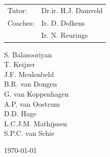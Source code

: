 \begin{titlepage}
\begin{center}
\vspace{0.5cm}
\begin{tabular}{l l}
Tutor: & Dr.ir. H.J. Damveld \\
Coaches: & Ir. D. Dolkens \\ 
 & Ir. N. Reurings \\
\end{tabular}

\vspace{1.5cm}
\begin{multicols}{3}
	S. Balasooriyan \\ T. Keijzer \\ J.F. Meulenbeld \\ B.R. van Dongen \\  G. van Koppenhagen \\ A.P. van Oostrum \\ D.D. Hage  \\ L.C.J.M. Mathijssen   \\ S.P.C. van Schie 
	\enlargethispage{15mm} \vspace{20mm}
\end{multicols}

\vfill

\begin{large}\today \end{large}

\end{center}
\end{titlepage}